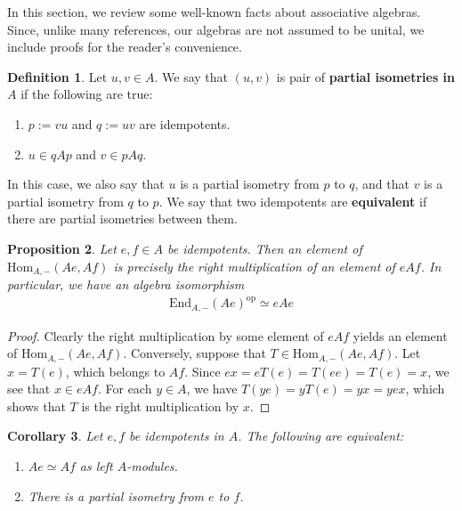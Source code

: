 \documentclass[11pt,b5paper,notitlepage]{article}
\theoremstyle{definition}
\newtheorem{df}{Definition}[section]
\theoremstyle{plain}
\newtheorem{pp}[df]{Proposition}
\newtheorem{co}[df]{Corollary}
\newcommand{\End}{\mathrm{End}} %
\newcommand{\Hom}{\mathrm{Hom}}
\newcommand{\opp}{\mathrm{op}}
\numberwithin{equation}{section}
\begin{document}
In this section, we review some well-known facts about associative algebras. Since, unlike many references, our algebras are not assumed to be unital, we include proofs for the reader's convenience.

\begin{df}
Let $u,v\in A$. We say that $(u,v)$ is pair of \textbf{partial isometries in $A$} if the following are true:
\begin{enumerate}[label=(\alph*)]
\item $p:=vu$ and $q:=uv$ are idempotents.
\item $u\in qAp$ and $v\in pAq$.
\end{enumerate}
In this case, we also say that $u$ is a partial isometry from $p$ to $q$, and that $v$ is a partial isometry from $q$ to $p$. We say that two idempotents are \textbf{equivalent} if there are partial isometries between them.
\end{df}


\begin{pp}\label{lb6}
Let $e,f\in A$ be idempotents. Then an element of $\Hom_{A,-}(Ae,Af)$ is precisely the right multiplication of an element of $eAf$. In particular, we have an algebra isomorphism
\begin{align*}
\End_{A,-}(Ae)^\opp\simeq eAe
\end{align*}
\end{pp}


\begin{proof}
Clearly the right multiplication by some element of $eAf$ yields an element of $\Hom_{A,-}(Ae,Af)$. Conversely, suppose that $T\in \Hom_{A,-}(Ae,Af)$. Let $x=T(e)$, which belongs to $Af$. Since $ex=eT(e)=T(ee)=T(e)=x$, we see that $x\in eAf$. For each $y\in A$, we have $T(ye)=yT(e)=yx=yex$, which shows that $T$ is the right multiplication by $x$.
\end{proof}



\begin{co}\label{lb13}
Let $e,f$ be idempotents in $A$. The following are equivalent: 
\begin{enumerate}[label=(\arabic*)]
\item $Ae\simeq Af$ as left $A$-modules.
\item There is a partial isometry from $e$ to $f$.
\end{enumerate}
\end{co}
\end{document}

